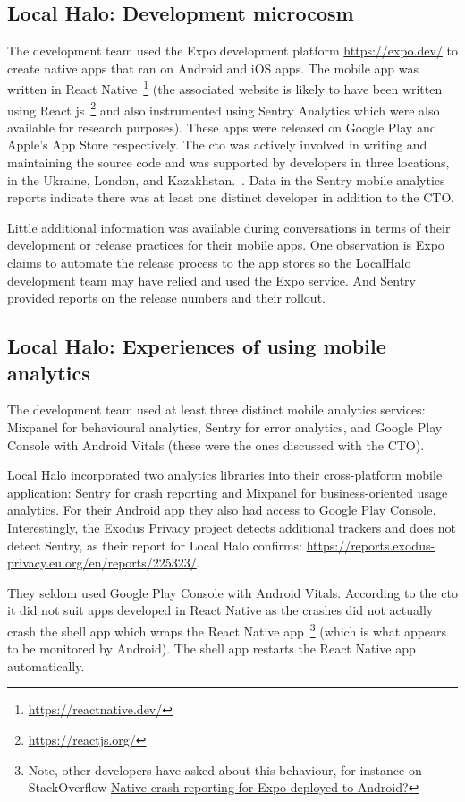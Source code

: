 \subsection{Local Halo: Development microcosm}
The development team used the Expo development platform \url{https://expo.dev/} to create native apps that ran on Android and iOS apps. The mobile app was written in React Native~\footnote{\url{https://reactnative.dev/}} (the associated website is likely to have been written using React js~\footnote{\url{https://reactjs.org/}} and also instrumented using Sentry Analytics which were also available for research purposes). These apps were released on Google Play and Apple's App Store respectively. The \acrshort{cto} was actively involved in writing and maintaining the source code and was supported by developers in three locations, in the Ukraine, London, and Kazakhstan.~.  Data in the Sentry mobile analytics reports indicate there was at least one distinct developer in addition to the CTO.

Little additional information was available during conversations in terms of their development or release practices for their mobile apps. One observation is Expo claims to automate the release process to the app stores so the LocalHalo development team may have relied and used the Expo service. And Sentry provided reports on the release numbers and their rollout.

\subsection{Local Halo: Experiences of using mobile analytics}
The development team used at least three distinct mobile analytics services: Mixpanel for behavioural analytics, Sentry for error analytics, and Google Play Console with Android Vitals (these were the ones discussed with the CTO). 

Local Halo incorporated two analytics libraries into their cross-platform mobile application: Sentry for crash reporting and Mixpanel for business-oriented usage analytics. For their Android app they also had access to Google Play Console. Interestingly, the Exodus Privacy project detects additional trackers and does not detect Sentry, as their report for Local Halo confirms: \url{https://reports.exodus-privacy.eu.org/en/reports/225323/}.

They seldom used Google Play Console with Android Vitals. According to the \acrshort{cto} it did not suit apps developed in React Native as the crashes did not actually crash the shell app which wraps the React Native app~\footnote{Note, other developers have asked about this behaviour, for instance on StackOverflow \href{https://stackoverflow.com/questions/66166824/native-crash-reporting-for-expo-deployed-to-android/}{Native crash reporting for Expo deployed to Android?}} 
(which is what appears to be monitored by Android). The shell app restarts the React Native app automatically.

